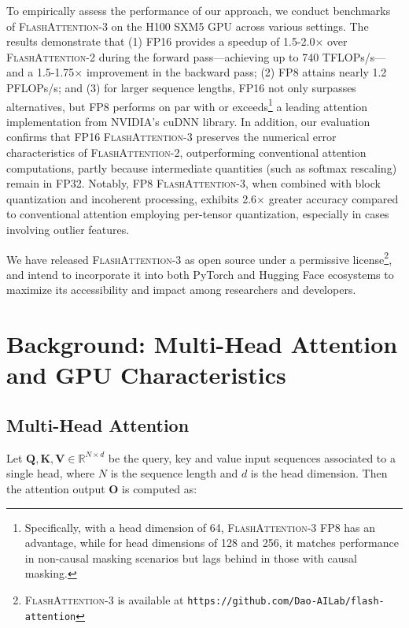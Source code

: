 To empirically assess the performance of our approach, we conduct benchmarks of \textsc{FlashAttention-3} on the H100 SXM5 GPU across various settings. The results demonstrate that (1) FP16 provides a speedup of 1.5-2.0$\times$ over \textsc{FlashAttention-2} during the forward pass—achieving up to 740 TFLOPs/s—and a 1.5-1.75$\times$ improvement in the backward pass; (2) FP8 attains nearly 1.2 PFLOPs/s; and (3) for larger sequence lengths, FP16 not only surpasses alternatives, but FP8 performs on par with or exceeds\footnote{Specifically, with a head dimension of 64, \textsc{FlashAttention-3} FP8 has an advantage, while for head dimensions of 128 and 256, it matches performance in non-causal masking scenarios but lags behind in those with causal masking.} a leading attention implementation from NVIDIA's cuDNN library. In addition, our evaluation confirms that FP16 \textsc{FlashAttention-3} preserves the numerical error characteristics of \textsc{FlashAttention-2}, outperforming conventional attention computations, partly because intermediate quantities (such as softmax rescaling) remain in FP32. Notably, FP8 \textsc{FlashAttention-3}, when combined with block quantization and incoherent processing, exhibits 2.6$\times$ greater accuracy compared to conventional attention employing per-tensor quantization, especially in cases involving outlier features.

We have released \textsc{FlashAttention-3} as open source under a permissive license\footnote{\textsc{FlashAttention-3}
  is available at \texttt{https://github.com/Dao-AILab/flash-attention}}, and intend to incorporate it into both PyTorch and Hugging Face ecosystems to maximize its accessibility and impact among researchers and developers.

\section{Background: Multi-Head Attention and GPU Characteristics}
\label{sec:background}

\subsection{Multi-Head Attention}
\label{subsec:multi_head_attn}

Let $\mathbf{Q}, \mathbf{K}, \mathbf{V} \in \mathbb{R}^{N \times d}$ be the query, key and value input sequences associated to a single head, where $N$ is the sequence length and $d$ is the head dimension. Then the attention output $\mathbf{O}$ is computed as:

